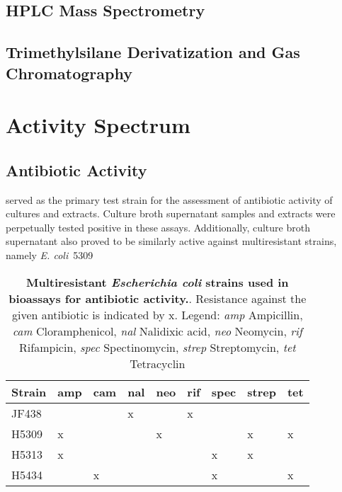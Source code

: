 \subsection{HPLC Mass Spectrometry} %
\label{sub:hplc_mass_spectrometry}


\subsection{Trimethylsilane Derivatization and Gas Chromatography} %
\label{sub:trimethylsilane_derivatization_and_gas_chromatography_results}




\section{Activity Spectrum} %
\label{sec:activity_spectrum}


\subsection{Antibiotic Activity} %
\label{sub:antibiotic_activity}

\coli{} served as the primary test strain for the assessment of antibiotic activity of \tue{} cultures and extracts.
Culture broth supernatant samples and extracts were perpetually tested positive in these assays.
Additionally, culture broth supernatant also proved to be similarly active against multiresistant strains, namely \emph{E. coli}~5309 

\begin{table}[htbp]
\caption[Multiresistant \emph{Escherichia coli} strains used in bioassays for antibiotic activity.]{%
	\textbf{Multiresistant \emph{Escherichia coli} strains used in bioassays for antibiotic activity.}.
    Resistance against the given antibiotic is indicated by x.
    Legend:
    \emph{amp} Ampicillin,
    \emph{cam} Cloramphenicol,
    \emph{nal} Nalidixic acid,
    \emph{neo} Neomycin,
    \emph{rif} Rifampicin,
    \emph{spec} Spectinomycin,
    \emph{strep} Streptomycin,
    \emph{tet} Tetracyclin
}
\label{tab:resistant_colis}
\centering
\begin{tabularx}{\textwidth}{XXXXXXXXX}
    \toprule
    Strain 	& amp 	& cam 	& nal 	& neo 	& rif 	& spec 	& strep 	& tet 	\\
    \midrule
    JF438 	&		&		& x		&		& x		& 		&			&		\\
    H5309	& x		& 		&		& x		&		&		& x			& x		\\
    H5313 	& x		&		&		&		&		& x		& x			&  		\\
    H5434 	& 		& x		& 		&		&		& x		&			& x 	\\
    \bottomrule
\end{tabularx}
\end{table}


